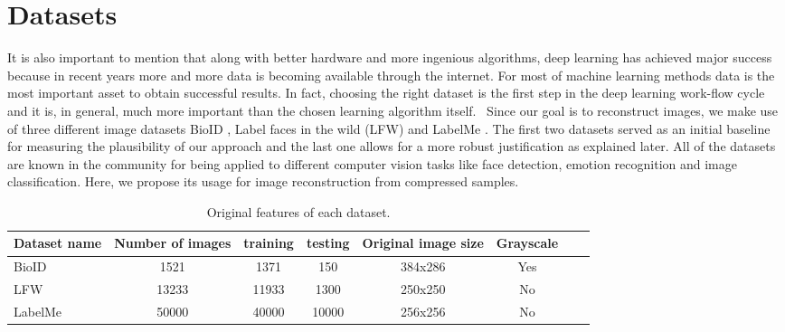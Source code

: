 \section{Datasets}
It is also important to mention that along with better hardware and more ingenious algorithms, deep learning has achieved major success because in recent years more and more data is becoming available through the internet. For most of machine learning methods data is the most important asset to obtain successful results. In fact, choosing the right dataset is the first step in the deep learning work-flow cycle and it is, in general, much more important than the chosen learning algorithm itself. \
Since our goal is to reconstruct images, we make use of three different image datasets BioID \cite{frischholz2003bioid}, Label faces in the wild (LFW) \cite{LFWTech} and LabelMe \cite{russell2008labelme}. The first two datasets served as an initial baseline for measuring the plausibility of our approach and the last one allows for a more robust justification as explained later. All of the datasets are known in the community for being applied to different computer vision tasks like face detection, emotion recognition and image classification. Here, we propose its usage for image reconstruction from compressed samples. 
\begin{table}[tb]
\caption[Datasets for training and testing]{Original features of each dataset.}
\label{tab:datasets1}
\centering
\begin{tabular}{l*{6}{c}r}
Dataset name              & Number of images & training & testing &  Original image size& Grayscale \\
\hline
BioID   & 1521 & 1371 & 150 & 384x286 & Yes\\
LFW     & 13233 & 11933 & 1300 & 250x250 & No\\
LabelMe & 50000 & 40000 & 10000 & 256x256 & No\\
\bottomrule 
\end{tabular}  
\end{table}

